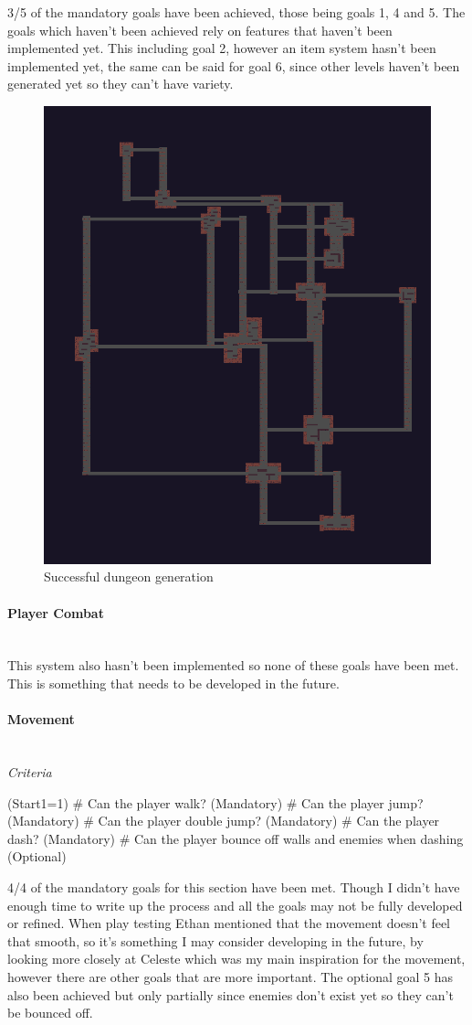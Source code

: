 \documentclass{article}
\newcommand{\parBr}{\vspace{5mm}}%
\newcommand{\myparagraph}[1]{\paragraph{#1}\mbox{}\\} %
\begin{document}
\parBr

3/5 of the mandatory goals have been achieved, those being goals 1, 4 and 5. The goals which haven't been achieved rely on features that haven't been implemented yet. This including goal 2, however an item system hasn't been implemented yet, the same can be said for goal 6, since other levels haven't been generated yet so they can't have variety. 

\begin{figure}[H]
\centering
\includegraphics[width = 0.5\linewidth]{successful dun gen}
\caption{Successful dungeon generation}
\label{dun_gen}
\end{figure}

\myparagraph{Player Combat}
This system also hasn't been implemented so none of these goals have been met. This is something that needs to be developed in the future.

\myparagraph{Movement}
\textit{Criteria}
\begin{easylist}
\ListProperties(Start1=1)
# Can the player walk? (Mandatory)
# Can the player jump? (Mandatory)
# Can the player double jump? (Mandatory)
# Can the player dash? (Mandatory)
# Can the player bounce off walls and enemies when dashing (Optional)
\end{easylist}

\parBr

4/4 of the mandatory goals for this section have been met. Though I didn't have enough time to write up the process and all the goals may not be fully developed or refined. When play testing Ethan mentioned that the movement doesn't feel that smooth, so it's something I may consider developing in the future, by looking more closely at Celeste which was my main inspiration for the movement, however there are other goals that are more important. The optional goal 5 has also been achieved but only partially since enemies don't exist yet so they can't be bounced off.
\end{document}
